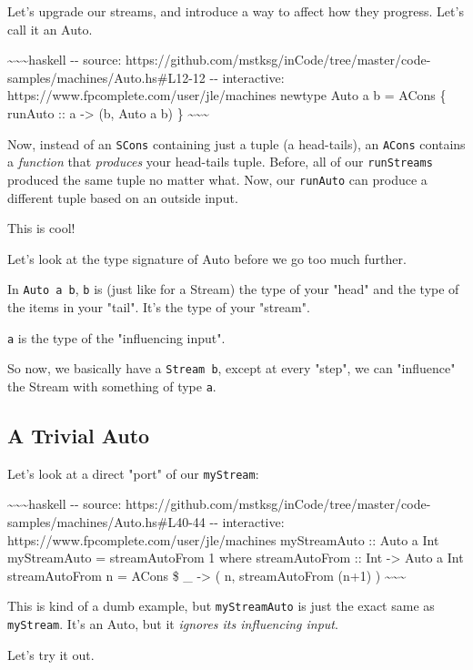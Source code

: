 \documentclass[]{article}
\begin{document}
Let's upgrade our streams, and introduce a way to affect how they progress.
Let's call it an Auto.

\textasciitilde{}\textasciitilde{}\textasciitilde{}haskell -\/- source:
https://github.com/mstksg/inCode/tree/master/code-samples/machines/Auto.hs\#L12-12
-\/- interactive: https://www.fpcomplete.com/user/jle/machines newtype Auto a b
= ACons \{ runAuto :: a -\textgreater{} (b, Auto a b) \}
\textasciitilde{}\textasciitilde{}\textasciitilde{}

Now, instead of an \texttt{SCons} containing just a tuple (a head-tails), an
\texttt{ACons} contains a \emph{function} that \emph{produces} your head-tails
tuple. Before, all of our \texttt{runStreams} produced the same tuple no matter
what. Now, our \texttt{runAuto} can produce a different tuple based on an
outside input.

This is cool!

Let's look at the type signature of Auto before we go too much further.

In \texttt{Auto\ a\ b}, \texttt{b} is (just like for a Stream) the type of your
"head" and the type of the items in your "tail". It's the type of your "stream".

\texttt{a} is the type of the "influencing input".

So now, we basically have a \texttt{Stream\ b}, except at every "step", we can
"influence" the Stream with something of type \texttt{a}.

\subsection{A Trivial Auto}

Let's look at a direct "port" of our \texttt{myStream}:

\textasciitilde{}\textasciitilde{}\textasciitilde{}haskell -\/- source:
https://github.com/mstksg/inCode/tree/master/code-samples/machines/Auto.hs\#L40-44
-\/- interactive: https://www.fpcomplete.com/user/jle/machines myStreamAuto ::
Auto a Int myStreamAuto = streamAutoFrom 1 where streamAutoFrom :: Int
-\textgreater{} Auto a Int streamAutoFrom n = ACons \$ \_ -\textgreater{} ( n,
streamAutoFrom (n+1) ) \textasciitilde{}\textasciitilde{}\textasciitilde{}

This is kind of a dumb example, but \texttt{myStreamAuto} is just the exact same
as \texttt{myStream}. It's an Auto, but it \emph{ignores its influencing input}.

Let's try it out.
\end{document}
